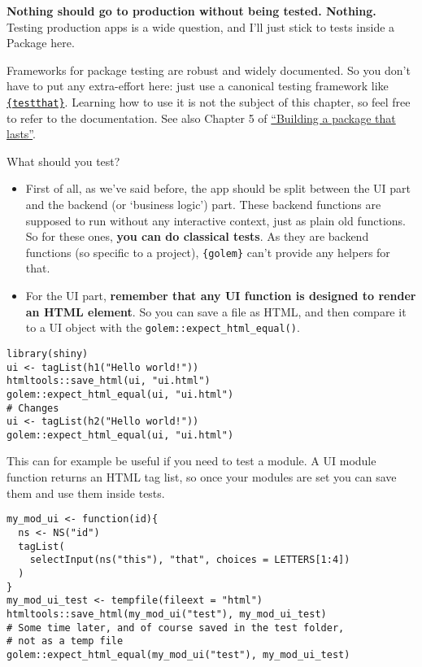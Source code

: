 \documentclass[]{book}
\begin{document}
\textbf{Nothing should go to production without being tested. Nothing.} Testing production apps is a wide question, and I'll just stick to tests inside a Package here.

Frameworks for package testing are robust and widely documented. So you don't have to put any extra-effort here: just use a canonical testing framework like \href{https://testthat.r-lib.org/}{\texttt{\{testthat\}}}. Learning how to use it is not the subject of this chapter, so feel free to refer to the documentation. See also Chapter 5 of \href{https://speakerdeck.com/colinfay/building-a-package-that-lasts-erum-2018-workshop?slide=107}{``Building a package that lasts''}.

What should you test?

\begin{itemize}
\item
  First of all, as we've said before, the app should be split between the UI part and the backend (or `business logic') part. These backend functions are supposed to run without any interactive context, just as plain old functions. So for these ones, \textbf{you can do classical tests}. As they are backend functions (so specific to a project), \texttt{\{golem\}} can't provide any helpers for that.
\item
  For the UI part, \textbf{remember that any UI function is designed to render an HTML element}. So you can save a file as HTML, and then compare it to a UI object with the \texttt{golem::expect\_html\_equal()}.
\end{itemize}

\begin{verbatim}
library(shiny)
ui <- tagList(h1("Hello world!"))
htmltools::save_html(ui, "ui.html")
golem::expect_html_equal(ui, "ui.html")
# Changes 
ui <- tagList(h2("Hello world!"))
golem::expect_html_equal(ui, "ui.html")
\end{verbatim}

This can for example be useful if you need to test a module. A UI module function returns an HTML tag list, so once your modules are set you can save them and use them inside tests.

\begin{verbatim}
my_mod_ui <- function(id){
  ns <- NS("id")
  tagList(
    selectInput(ns("this"), "that", choices = LETTERS[1:4])
  )
}
my_mod_ui_test <- tempfile(fileext = "html")
htmltools::save_html(my_mod_ui("test"), my_mod_ui_test)
# Some time later, and of course saved in the test folder, 
# not as a temp file
golem::expect_html_equal(my_mod_ui("test"), my_mod_ui_test)
\end{verbatim}
\end{document}
